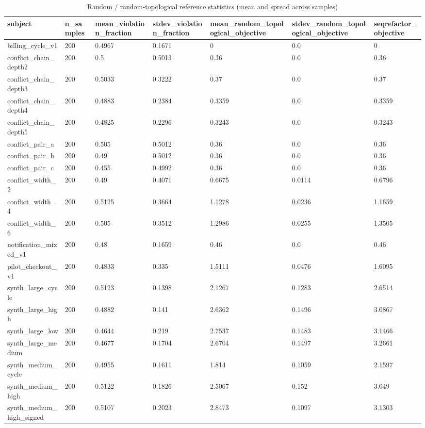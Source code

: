 \begin{table}[t]
\centering
\caption{Random / random-topological reference statistics (mean and spread across samples)}
\label{tab:random-baseline}
\begin{tabular}{lllllll}
\toprule
subject & n\_samples & mean\_violation\_fraction & stdev\_violation\_fraction & mean\_random\_topological\_objective & stdev\_random\_topological\_objective & seqrefactor\_objective \\
\midrule
billing\_cycle\_v1 & 200 & 0.4967 & 0.1671 & 0 & 0.0 & 0 \\
conflict\_chain\_depth2 & 200 & 0.5 & 0.5013 & 0.36 & 0.0 & 0.36 \\
conflict\_chain\_depth3 & 200 & 0.5033 & 0.3222 & 0.37 & 0.0 & 0.37 \\
conflict\_chain\_depth4 & 200 & 0.4883 & 0.2384 & 0.3359 & 0.0 & 0.3359 \\
conflict\_chain\_depth5 & 200 & 0.4825 & 0.2296 & 0.3243 & 0.0 & 0.3243 \\
conflict\_pair\_a & 200 & 0.505 & 0.5012 & 0.36 & 0.0 & 0.36 \\
conflict\_pair\_b & 200 & 0.49 & 0.5012 & 0.36 & 0.0 & 0.36 \\
conflict\_pair\_c & 200 & 0.455 & 0.4992 & 0.36 & 0.0 & 0.36 \\
conflict\_width\_2 & 200 & 0.49 & 0.4071 & 0.6675 & 0.0114 & 0.6796 \\
conflict\_width\_4 & 200 & 0.5125 & 0.3664 & 1.1278 & 0.0236 & 1.1659 \\
conflict\_width\_6 & 200 & 0.505 & 0.3512 & 1.2986 & 0.0255 & 1.3505 \\
notification\_mixed\_v1 & 200 & 0.48 & 0.1659 & 0.46 & 0.0 & 0.46 \\
pilot\_checkout\_v1 & 200 & 0.4833 & 0.335 & 1.5111 & 0.0476 & 1.6095 \\
synth\_large\_cycle & 200 & 0.5123 & 0.1398 & 2.1267 & 0.1283 & 2.6514 \\
synth\_large\_high & 200 & 0.4882 & 0.141 & 2.6362 & 0.1496 & 3.0867 \\
synth\_large\_low & 200 & 0.4644 & 0.219 & 2.7537 & 0.1483 & 3.1466 \\
synth\_large\_medium & 200 & 0.4677 & 0.1704 & 2.6704 & 0.1497 & 3.2661 \\
synth\_medium\_cycle & 200 & 0.4955 & 0.1611 & 1.814 & 0.1059 & 2.1597 \\
synth\_medium\_high & 200 & 0.5122 & 0.1826 & 2.5067 & 0.152 & 3.049 \\
synth\_medium\_high\_signed & 200 & 0.5107 & 0.2023 & 2.8473 & 0.1097 & 3.1303 \\

\end{tabular}
\end{table}
